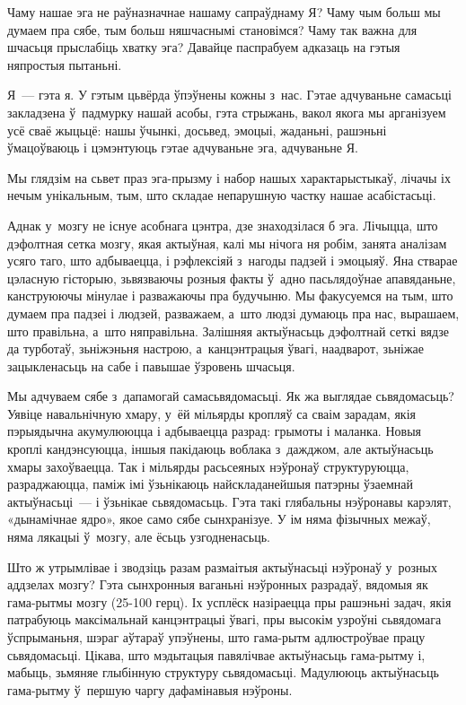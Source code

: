 Чаму нашае эга не раўназначнае нашаму сапраўднаму Я? Чаму чым больш мы думаем пра сябе, тым больш няшчаснымі становімся? Чаму так важна для шчасьця прыслабіць хватку эга? Давайце паспрабуем адказаць на гэтыя няпростыя пытаньні.

Я~--- гэта я. У гэтым цьвёрда ўпэўнены кожны з~нас. Гэтае адчуваньне самасьці закладзена ў~падмурку нашай асобы, гэта стрыжань, вакол якога мы арганізуем усё сваё жыцьцё: нашы ўчынкі, досьвед, эмоцыі, жаданьні, рашэньні ўмацоўваюць і цэмэнтуюць гэтае адчуваньне эга, адчуваньне Я.

Мы глядзім на сьвет праз эга-прызму і набор нашых характарыстыкаў, лічачы іх нечым унікальным, тым, што складае непарушную частку нашае асабістасьці.

Аднак у~мозгу не існуе асобнага цэнтра, дзе знаходзілася б эга. Лічыцца, што дэфолтная сетка мозгу, якая актыўная, калі мы нічога ня робім, занята аналізам усяго таго, што адбываецца, і рэфлексіяй з~нагоды падзей і эмоцыяў. Яна стварае цэласную гісторыю, зьвязваючы розныя факты ў~адно пасьлядоўнае апавяданьне, канструюючы мінулае і разважаючы пра будучыню. Мы факусуемся на тым, што думаем пра падзеі і людзей, разважаем, а~што людзі думаюць пра нас, вырашаем, што правільна, а~што няправільна. Залішняя актыўнасьць дэфолтнай сеткі вядзе да турботаў, зьніжэньня настрою, а~канцэнтрацыя ўвагі, наадварот, зьніжае зацыкленасьць на сабе і павышае ўзровень шчасьця.

Мы адчуваем сябе з~дапамогай самасьвядомасьці. Як жа выглядае сьвядомасьць? Уявіце навальнічную хмару, у~ёй мільярды кропляў са сваім зарадам, якія пэрыядычна акумулююцца і адбываецца разрад: грымоты і маланка. Новыя кроплі кандэнсуюцца, іншыя пакідаюць воблака з~дажджом, але актыўнасьць хмары захоўваецца. Так і мільярды расьсеяных нэўронаў структуруюцца, разраджаюцца, паміж імі ўзьнікаюць найскладанейшыя патэрны ўзаемнай актыўнасьці~--- і ўзьнікае сьвядомасьць. Гэта такі глябальны нэўронавы карэлят, «дынамічнае ядро», якое само сябе сынхранізуе. У ім няма фізычных межаў, няма лякацыі ў~мозгу, але ёсьць узгодненасьць.

Што ж утрымлівае і зводзіць разам размаітыя актыўнасьці нэўронаў у~розных аддзелах мозгу? Гэта сынхронныя ваганьні нэўронных разрадаў, вядомыя як гама-рытмы мозгу (25-100 герц). Іх усплёск назіраецца пры рашэньні задач, якія патрабуюць максімальнай канцэнтрацыі ўвагі, пры высокім узроўні сьвядомага ўспрыманьня, шэраг аўтараў упэўнены, што гама-рытм адлюстроўвае працу сьвядомасьці. Цікава, што мэдытацыя павялічвае актыўнасьць гама-рытму і, мабыць, зьмяняе глыбінную структуру сьвядомасьці. Мадулююць актыўнасьць гама-рытму ў~першую чаргу дафамінавыя нэўроны.

